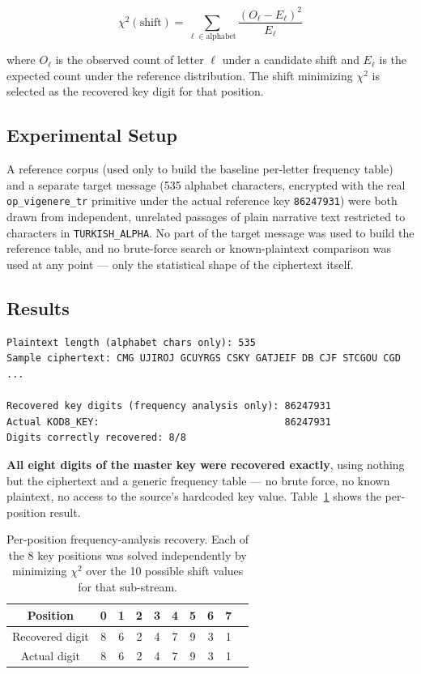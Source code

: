 \documentclass[11pt]{article}
\begin{document}
\[
  \chi^2(\text{shift}) = \sum_{\ell \in \text{alphabet}} \frac{\left(O_\ell - E_\ell\right)^2}{E_\ell}
\]

where $O_\ell$ is the observed count of letter $\ell$ under a candidate
shift and $E_\ell$ is the expected count under the reference
distribution. The shift minimizing $\chi^2$ is selected as the
recovered key digit for that position.

\subsection{Experimental Setup}

A reference corpus (used only to build the baseline per-letter
frequency table) and a separate target message (535 alphabet
characters, encrypted with the real \texttt{op\_vigenere\_tr} primitive
under the actual reference key \texttt{86247931}) were both drawn from
independent, unrelated passages of plain narrative text restricted to
characters in \texttt{TURKISH\_ALPHA}. No part of the target message
was used to build the reference table, and no brute-force search or
known-plaintext comparison was used at any point --- only the statistical
shape of the ciphertext itself.

\subsection{Results}

\begin{lstlisting}
Plaintext length (alphabet chars only): 535
Sample ciphertext: CMG UJIROJ GCUYRGS CSKY GATJEIF DB CJF STCGOU CGD ...

Recovered key digits (frequency analysis only): 86247931
Actual KOD8_KEY:                                86247931
Digits correctly recovered: 8/8
\end{lstlisting}

\textbf{All eight digits of the master key were recovered exactly},
using nothing but the ciphertext and a generic frequency table --- no
brute force, no known plaintext, no access to the source's hardcoded
key value. Table~\ref{tab:freq-detail} shows the per-position result.

\begin{table}[h]
\centering
\small
\caption{Per-position frequency-analysis recovery. Each of the 8 key positions was solved independently by minimizing $\chi^2$ over the 10 possible shift values for that sub-stream.}
\label{tab:freq-detail}
\begin{tabular}{@{}cccccccccc@{}}
\toprule
Position & 0 & 1 & 2 & 3 & 4 & 5 & 6 & 7 \\
\midrule
Recovered digit & 8 & 6 & 2 & 4 & 7 & 9 & 3 & 1 \\
Actual digit     & 8 & 6 & 2 & 4 & 7 & 9 & 3 & 1 \\
\bottomrule
\end{tabular}
\end{table}
\end{document}
